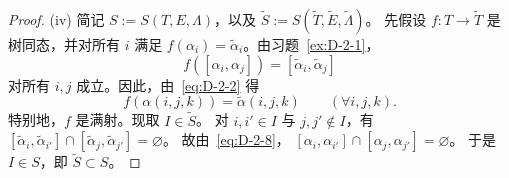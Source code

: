 \begin{proof}
\textup{(iv)} 简记 $S:=S(T,E,\Lambda)$，以及
$\widetilde S:=S(\widetilde T,\widetilde E,\widetilde\Lambda)$。
先假设 $f:T\to\widetilde T$ 是树同态，并对所有 $i$ 满足
$f(\alpha_i)=\widetilde\alpha_i$。由习题~\ref{ex:D-2-1}，
\begin{equation}\label{eq:D-2-8}
  f([\alpha_i,\alpha_j])
  =[\widetilde\alpha_i,\widetilde\alpha_j]
\end{equation}
对所有 $i,j$ 成立。因此，由~\eqref{eq:D-2-2} 得
\[
  f(\alpha(i,j,k))=\widetilde\alpha(i,j,k)
  \qquad(\forall i,j,k).
\]
特别地，$f$ 是满射。现取 $I\in\widetilde S$。
对 $i,i'\in I$ 与 $j,j'\notin I$，有
$[\widetilde\alpha_i,\widetilde\alpha_{i'}]\cap
[\widetilde\alpha_j,\widetilde\alpha_{j'}]=\varnothing$。
故由~\eqref{eq:D-2-8}，
$[\alpha_i,\alpha_{i'}]\cap[\alpha_j,\alpha_{j'}]=\varnothing$。
于是 $I\in S$，即 $\widetilde S\subset S$。


\end{proof}
